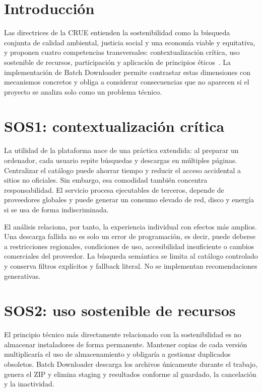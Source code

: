 
\section{Introducción}

Las directrices de la CRUE entienden la sostenibilidad como la búsqueda conjunta de calidad ambiental, justicia social y una economía viable y equitativa, y proponen cuatro competencias transversales: contextualización crítica, uso sostenible de recursos, participación y aplicación de principios éticos~\cite{crue2012}. La implementación de Batch Downloader permite contrastar estas dimensiones con mecanismos concretos y obliga a considerar consecuencias que no aparecen si el proyecto se analiza solo como un problema técnico.

\section{SOS1: contextualización crítica}

La utilidad de la plataforma nace de una práctica extendida: al preparar un ordenador, cada usuario repite búsquedas y descargas en múltiples páginas. Centralizar el catálogo puede ahorrar tiempo y reducir el acceso accidental a sitios no oficiales. Sin embargo, esa comodidad también concentra responsabilidad. El servicio procesa ejecutables de terceros, depende de proveedores globales y puede generar un consumo elevado de red, disco y energía si se usa de forma indiscriminada.

El análisis relaciona, por tanto, la experiencia individual con efectos más amplios. Una descarga fallida no es solo un error de programación, es decir, puede deberse a restricciones regionales, condiciones de uso, accesibilidad insuficiente o cambios comerciales del proveedor. La búsqueda semántica se limita al catálogo controlado y conserva filtros explícitos y fallback literal. No se implementan recomendaciones generativas.

\section{SOS2: uso sostenible de recursos}

El principio técnico más directamente relacionado con la sostenibilidad es no almacenar instaladores de forma permanente. Mantener copias de cada versión multiplicaría el uso de almacenamiento y obligaría a gestionar duplicados obsoletos. Batch Downloader descarga los archivos únicamente durante el trabajo, genera el ZIP y elimina staging y resultados conforme al guardado, la cancelación y la inactividad.

